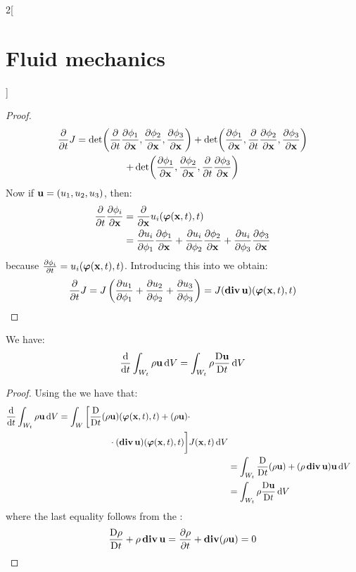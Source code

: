\documentclass[../../../main_physics.tex]{subfiles}
\begin{document}
\begin{multicols}{2}[\section{Fluid mechanics}]
\begin{proof}
\begin{multline}
      \pdv{}{t}J=\det(\pdv{}{t}\pdv{\phi_1}{\boldsymbol{\mathrm{x}}},\pdv{\phi_2}{\boldsymbol{\mathrm{x}}},\pdv{\phi_3}{\boldsymbol{\mathrm{x}}})+\det(\pdv{\phi_1}{\boldsymbol{\mathrm{x}}},\pdv{}{t}\pdv{\phi_2}{\boldsymbol{\mathrm{x}}},\pdv{\phi_3}{\boldsymbol{\mathrm{x}}})\\+\det(\pdv{\phi_1}{\boldsymbol{\mathrm{x}}},\pdv{\phi_2}{\boldsymbol{\mathrm{x}}},\pdv{}{t}\pdv{\phi_3}{\boldsymbol{\mathrm{x}}})
    \end{multline}
    Now if $\boldsymbol{\mathrm{u}}=(u_1,u_2,u_3)$, then:
    \begin{align*}
      \pdv{}{t}\pdv{\phi_i}{\boldsymbol{\mathrm{x}}} & =\pdv{}{\boldsymbol{\mathrm{x}}}u_i(\boldsymbol{\mathrm{\varphi}}(\boldsymbol{\mathrm{x}},t),t)                                                                         \\
                                    & =\pdv{u_i}{\phi_1}\pdv{\phi_1}{\boldsymbol{\mathrm{x}}}+\pdv{u_i}{\phi_2}\pdv{\phi_2}{\boldsymbol{\mathrm{x}}}+\pdv{u_i}{\phi_3}\pdv{\phi_3}{\boldsymbol{\mathrm{x}}} \\
    \end{align*}
    because $\pdv{\phi_i}{t} = u_i(\boldsymbol{\mathrm{\varphi}}(\boldsymbol{\mathrm{x}},t),t)$.
    Introducing this into  we obtain:
    $$
      \pdv{}{t}J=J\left(\pdv{u_1}{\phi_1}+\pdv{u_2}{\phi_2}+\pdv{u_3}{\phi_3}\right)=J(\operatorname{\boldsymbol{\mathrm{div}}}\boldsymbol{\mathrm{u}})(\boldsymbol{\mathrm{\varphi}}(\boldsymbol{\mathrm{x}},t),t)
    $$
  \end{proof}
  \begin{corollary}
    We have:
    $$
      \dv{}{t}\int_{W_t}\rho\boldsymbol{\mathrm{u}}\dd{V}=\int_{W_t}\rho\frac{\mathrm{D}\boldsymbol{\mathrm{u}}}{\mathrm{D}t}\dd{V}
    $$
  \end{corollary}
  \begin{proof}
    Using the  we have that:
    \begin{align*}
      \begin{split}
        \dv{}{t}\int_{W_t}\rho\boldsymbol{\mathrm{u}}\dd{V}&=\int_W\left[
          \frac{\mathrm{D}}{\mathrm{D}t}(\rho\boldsymbol{\mathrm{u}})(\boldsymbol{\mathrm{\varphi}}(\boldsymbol{\mathrm{x}},t),t)+(\rho\boldsymbol{\mathrm{u}})\cdot\right.\\
          &\hspace{2cm}\cdot(\operatorname{\boldsymbol{\mathrm{div}}}\boldsymbol{\mathrm{u}})(\boldsymbol{\mathrm{\varphi}}(\boldsymbol{\mathrm{x}},t),t)
          \bigg]J(\boldsymbol{\mathrm{x}},t)\dd{V}
      \end{split}     \\
       & = \int_{W_t}\frac{\mathrm{D}}{\mathrm{D}t}(\rho\boldsymbol{\mathrm{u}})+(\rho\operatorname{\boldsymbol{\mathrm{div}}}\boldsymbol{\mathrm{u}}) \boldsymbol{\mathrm{u}}\dd{V} \\
       & = \int_{W_t}\rho\frac{\mathrm{D}\boldsymbol{\mathrm{u}}}{\mathrm{D}t}\dd{V}
    \end{align*}
    where the last equality follows from the :
    $$
      \frac{\mathrm{D}\rho}{\mathrm{D}t}+\rho\operatorname{\boldsymbol{\mathrm{div}}}\boldsymbol{\mathrm{u}}=\pdv{\rho}{t}+\operatorname{\boldsymbol{\mathrm{div}}}(\rho\boldsymbol{\mathrm{u}})=0
    $$
  \end{proof}
  \begin{corollary}\label{FLM:trasport}

\end{corollary}
\end{multicols}
\end{document}
